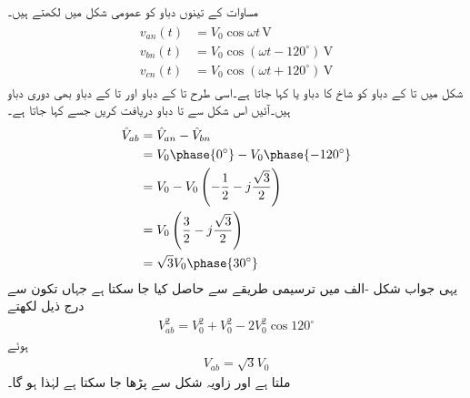 مساوات  کے تینوں دباو کو عمومی شکل میں لکھتے ہیں۔
\begin{gather}
\begin{aligned}
v_{an}(t)&=V_0 \cos\omega t \,\si{\volt}\\
v_{bn}(t)&=V_0 \cos(\omega t-120^{\circ})\,\si{\volt}\\
v_{cn}(t)&=V_0 \cos(\omega t +120^{\circ})\,\si{\volt}
\end{aligned}
\end{gather}
شکل  میں  تا  کے دباو  کو شاخ کا دباو یا  کہا جاتا ہے۔اسی طرح   تا  کے دباو  اور   تا  کے دباو  بھی دوری دباو ہیں۔آئیں اس شکل سے  تا  دباو دریافت کریں جسے  کہا جاتا ہے۔
\begin{align*}
\hat{V}_{ab}&=\hat{V}_{an}-\hat{V}_{bn}\\
&=V_0\phase{0^{\circ}}-V_0\phase{-120^{\circ}}\\
&=V_0-V_0\left(-\frac{1}{2}-j\frac{\sqrt{3}}{2}\right)\\
&=V_0\left(\frac{3}{2}-j\frac{\sqrt{3}}{2}\right)\\
&=\sqrt{3}V_0\phase{30^{\circ}}
\end{align*}
یہی جواب شکل -الف میں ترسیمی طریقے سے حاصل کیا جا سکتا ہے جہاں تکون سے درج ذیل لکھتے
\begin{align*}
V^2_{ab}=V^2_0+V^2_0-2V^2_0\cos 120^{\circ}
\end{align*}
ہوئے
\begin{align}
V_{ab}=\sqrt{3}V_0
\end{align}
ملتا ہے اور زاویہ شکل سے  پڑھا جا سکتا ہے لہٰذا  ہو گا۔

